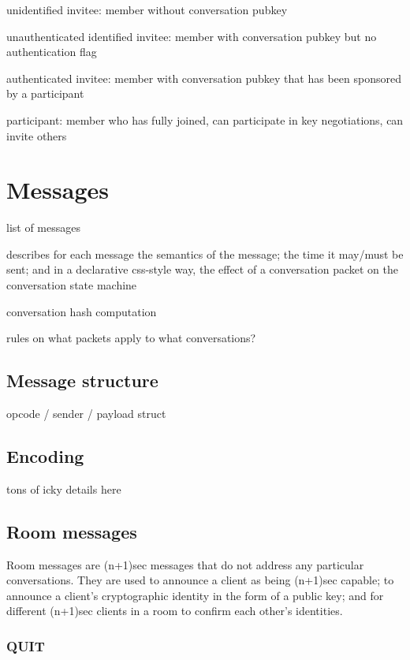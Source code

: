 \documentclass{article}
\begin{document}
unidentified invitee: member without conversation pubkey

unauthenticated identified invitee: member with conversation pubkey but no authentication flag

authenticated invitee: member with conversation pubkey that has been sponsored by a participant

participant: member who has fully joined, can participate in key negotiations, can invite others



\section{Messages}
\label{sec:messages}
list of messages

describes for each message the semantics of the message; the time it may/must be sent; and in a declarative css-style way, the effect of a conversation packet on the conversation state machine

conversation hash computation

rules on what packets apply to what conversations?

\subsection{Message structure}

opcode / sender / payload struct

\subsection{Encoding}

tons of icky details here

\subsection{Room messages}

Room messages are (n+1)sec messages that do not address any particular conversations.
They are used to announce a client as being (n+1)sec capable; to announce a client's cryptographic identity in the form of a public key; and for different (n+1)sec clients in a room to confirm each other's identities.

\subsubsection{QUIT}
\label{sec:messages/quit}
\end{document}
